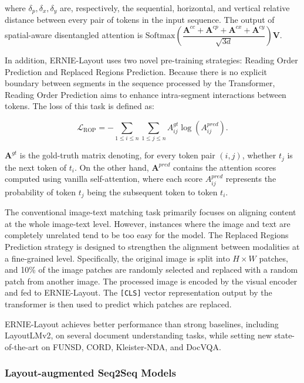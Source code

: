 \noindent where $\delta_p, \delta_x, \delta_y$ are, respectively, the sequential, horizontal, and vertical relative distance between every pair of tokens in the input sequence. The output of spatial-aware disentangled attention is $\text{Softmax}\left( \dfrac{\bm{A}^{cc} + \bm{A}^{cp} + \bm{A}^{cx} + \bm{A}^{cy}}{\sqrt{3d}}\right) \bm{V}$.

In addition, ERNIE-Layout uses two novel pre-training strategies: Reading Order Prediction and Replaced Regions Prediction. Because there is no explicit boundary between segments in the sequence processed by the Transformer, Reading Order Prediction aims to enhance intra-segment interactions between tokens. The loss of this task is defined as:

\begin{equation}
    \mathcal{L}_{\text{ROP}} = - \sum_{1 \leq i \leq n}\sum_{1 \leq j \leq n} A^{gt}_{ij} \log(A^{pred}_{ij}).
\end{equation}

\noindent $\bm{A}^{gt}$ is the gold-truth matrix denoting, for every token pair $(i, j)$, whether $t_j$ is the next token of $t_i$. On the other hand, $\bm{A}^{pred}$ contains the attention scores computed using vanilla self-attention, where each score $A^{pred}_{ij}$ represents the probability of token $t_j$ being the subsequent token to token $t_i$. 

\noindent The conventional image-text matching task primarily focuses on aligning content at the whole image-text level. However, instances where the image and text are completely unrelated tend to be too easy for the model. The Replaced Regions Prediction strategy is designed to strengthen the alignment between modalities at a fine-grained level. Specifically, the original image is split into $H \times W$ patches, and 10\% of the image patches are randomly selected and replaced with a random patch from another image. The processed image is encoded by the visual encoder and fed to ERNIE-Layout. The \texttt{[CLS]} vector representation output by the transformer is then used to predict which patches are replaced. 

ERNIE-Layout achieves better performance than strong baselines, including LayoutLMv2, on several document understanding tasks, while setting new state-of-the-art on FUNSD, CORD, Kleister-NDA, and DocVQA.


\subsubsection{Layout-augmented Seq2Seq Models}

